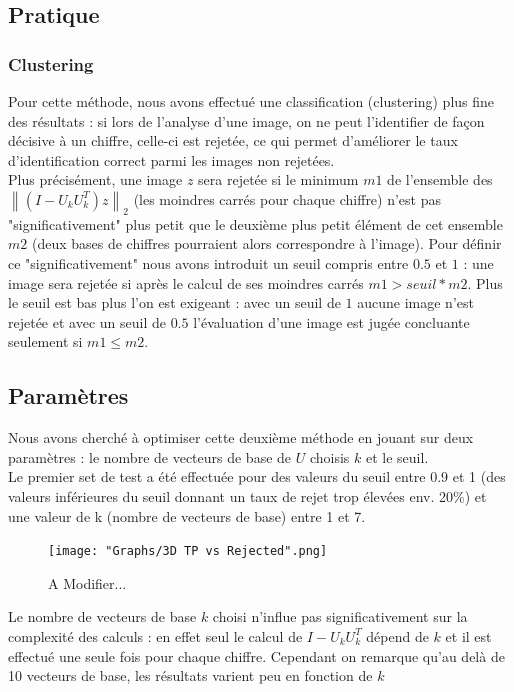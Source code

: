 \documentclass[a4paper,11pt,twoside]{report}
\newcommand{\norm}[1]{\left\lVert#1\right\rVert} %
\begin{document}
\subsection{Pratique}
\subsubsection{Clustering}%
Pour cette méthode, nous avons effectué une classification (clustering) plus fine des résultats : si lors de l'analyse d'une image, on ne peut l'identifier de façon décisive à un chiffre, celle-ci est rejetée, ce qui permet d'améliorer le taux d'identification correct parmi les images non rejetées. \\
Plus précisément, une image $z$ sera rejetée si le minimum $m1$ de l'ensemble des $ \norm{(I-U_{k}U_{k}^{T})z}_{2}$ (les moindres carrés pour chaque chiffre) n'est pas "significativement" plus petit que le deuxième plus petit élément de cet ensemble $m2$ (deux bases de chiffres pourraient alors correspondre à l'image). Pour définir ce "significativement" nous avons introduit un seuil compris entre $0.5$ et $1$ : une image sera rejetée si après le calcul de ses moindres carrés $m1>seuil*m2$. Plus le seuil est bas plus l'on est exigeant : avec un seuil de $1$ aucune image n'est rejetée et avec un seuil de $0.5$ l'évaluation d'une image est jugée concluante seulement si $m1\leq m2$.\\
\subsection{Paramètres}
Nous avons cherché à optimiser cette deuxième méthode en jouant sur deux paramètres : le nombre de vecteurs de base de $U$ choisis $k$ et le seuil.\\

Le premier set de test a été effectuée pour des valeurs du seuil entre 0.9 et 1 (des valeurs inférieures du seuil donnant un taux de rejet trop élevées env. 20\%) et une valeur de k (nombre de vecteurs de base) entre 1 et 7.\\

\begin{figure}[H]
  	\texttt{[image: "Graphs/3D TP vs Rejected".png]}
  	\caption{A Modifier...}
\end{figure}

Le nombre de vecteurs de base $k$ choisi n'influe pas significativement sur la complexité des calculs : en effet seul le calcul de $I-U_{k}U_{k}^{T}$ dépend de $k$ et il est effectué une seule fois pour chaque chiffre. Cependant on remarque qu'au delà de 10 vecteurs de base, les résultats varient peu en fonction de $k$ %
\end{document}
